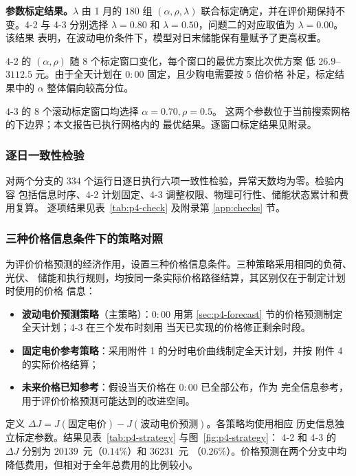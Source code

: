 \textbf{参数标定结果。}$\lambda$ 由 1 月的 $180$ 组
$(\alpha,\rho,\lambda)$ 联合标定确定，并在评价期保持不变。4-2 与 4-3 分别选择
$\lambda=0.80$ 和 $\lambda=0.50$，问题二的对应取值为 $\lambda=0.00$。该结果
表明，在波动电价条件下，模型对日末储能保有量赋予了更高权重。

$4$-$2$ 的 $(\alpha,\rho)$ 随 $8$ 个标定窗口变化，每个窗口的最优方案比次优方案
低 $26.9$--$3112.5$ 元。由于全天计划在 $0{:}00$ 固定，且少购电需要按 $5$ 倍价格
补足，标定结果中的 $\alpha$ 整体偏向较高分位。

$4$-$3$ 的 $8$ 个滚动标定窗口均选择 $\alpha=0.70,\rho=0.5$。
这两个参数位于当前搜索网格的下边界；本文报告已执行网格内的
最优结果。逐窗口标定结果见附录。

\subsubsection{逐日一致性检验}

对两个分支的 $334$ 个运行日逐日执行六项一致性检验，异常天数均为零。检验内容
包括信息时序、4-2 计划固定、4-3 调整权限、物理可行性、储能状态累计和费用复算。
逐项结果见表~\ref{tab:p4-check} 及附录第 \ref{app:checks} 节。

\subsubsection{三种价格信息条件下的策略对照}
\label{sec:p4-strategy}

为评价价格预测的经济作用，设置三种价格信息条件。三种策略采用相同的负荷、光伏、
储能和执行规则，均按同一条实际价格路径结算，其区别仅在于制定计划时使用的价格
信息：

\begin{itemize}
  \item \textbf{波动电价预测策略}（主策略）：$0{:}00$ 用第
        \ref{sec:p4-forecast} 节的价格预测制定全天计划；4-3 在三个发布时刻用
        当天已实现的价格修正剩余时段。
  \item \textbf{固定电价参考策略}：采用附件 1 的分时电价曲线制定全天计划，并按
        附件 4 的实际价格结算；
  \item \textbf{未来价格已知参考}：假设当天价格在 $0{:}00$ 已全部公布，作为
        完全信息参考，用于评价价格预测可能达到的改进空间。
\end{itemize}

定义 $\Delta J=J(\text{固定电价})-J(\text{波动电价预测})$。各策略均使用相应
历史信息独立标定参数。结果见表~\ref{tab:p4-strategy} 与图~\ref{fig:p4-strategy}：
4-2 和 4-3 的 $\Delta J$ 分别为 $20139$~元（$0.14\%$）和 $36231$~元
（$0.26\%$）。价格预测在两个分支中均降低费用，但相对于全年总费用的比例较小。

